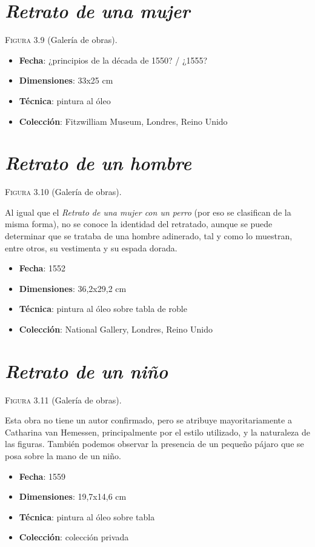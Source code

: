 \documentclass[12pt]{report}
\begin{document}
\section{\textit{Retrato de una mujer}}

\textsc{Figura 3.9} (Galería de obras).\bigskip

\begin{itemize}
	\item \textbf{Fecha}: ¿principios de la década de 1550? / ¿1555?
	\item \textbf{Dimensiones}: 33x25 cm
	\item \textbf{Técnica}: pintura al óleo
	\item \textbf{Colección}: Fitzwilliam Museum, Londres, Reino Unido
\end{itemize}

\section{\textit{Retrato de un hombre}}

\textsc{Figura 3.10} (Galería de obras).\bigskip

Al igual que el \textit{Retrato de una mujer con un perro} (por eso se clasifican de la misma forma), no se conoce la identidad del retratado, aunque se puede determinar que se trataba de una hombre adinerado, tal y como lo muestran, entre otros, su vestimenta y su espada dorada.
\begin{itemize}
	\item \textbf{Fecha}: 1552
	\item \textbf{Dimensiones}: 36,2x29,2 cm
	\item \textbf{Técnica}: pintura al óleo sobre tabla de roble
	\item \textbf{Colección}: National Gallery, Londres, Reino Unido
\end{itemize}

\section{\textit{Retrato de un niño}}

\textsc{Figura 3.11} (Galería de obras).\bigskip

Esta obra no tiene un autor confirmado, pero se atribuye mayoritariamente a Catharina van Hemessen, principalmente por el estilo utilizado, y la naturaleza de las figuras. También podemos observar la presencia de un pequeño pájaro que se posa sobre la mano de un niño.
\begin{itemize}
	\item \textbf{Fecha}: 1559
	\item \textbf{Dimensiones}: 19,7x14,6 cm
	\item \textbf{Técnica}: pintura al óleo sobre tabla
	\item \textbf{Colección}: colección privada
\end{itemize}
\end{document}
